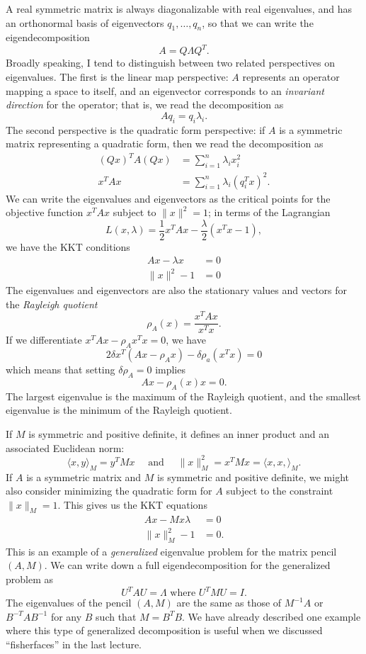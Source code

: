 \documentclass[12pt, leqno]{article} %
\begin{document}
A real symmetric matrix is always diagonalizable with
real eigenvalues, and has an orthonormal basis of eigenvectors
$q_1, \ldots, q_n$, so that we can write the eigendecomposition
\[
  A = Q \Lambda Q^T.
\]
Broadly speaking, I tend to distinguish between two related
perspectives on eigenvalues.  The first is the linear map
perspective: $A$ represents an operator mapping a space to itself,
and an eigenvector corresponds to an {\em invariant direction}
for the operator; that is, we read the decomposition as
\[
  A q_i = q_i \lambda_i.
\]  
The second perspective is the quadratic form
perspective: if $A$ is a symmetric matrix representing a quadratic
form, then we read the decomposition as
\begin{align*}
  (Qx)^T A (Qx) &= \sum_{i=1}^n \lambda_i x_i^2 \\
  x^T A x &= \sum_{i=1}^n \lambda_i (q_i^T x)^2.
\end{align*}
We can write the eigenvalues and eigenvectors as the critical points
for the objective function $x^T A x$ subject to $\|x\|^2 = 1$;
in terms of the Lagrangian
\[
  L(x,\lambda) = \frac{1}{2} x^T A x - \frac{\lambda}{2} (x^T x - 1),
\]
we have the KKT conditions
\begin{align*}
  Ax - \lambda x &= 0 \\
 \|x\|^2-1 &= 0
\end{align*}
The eigenvalues and eigenvectors are also the
stationary values and vectors for the {\em Rayleigh quotient}
\[
  \rho_A(x) = \frac{x^T A x}{x^T x}.
\]
If we differentiate $x^T A x - \rho_A x^T x = 0$, we have
\[
  2 \delta x^T (Ax - \rho_A x) - \delta \rho_a (x^T x) = 0
\]
which means that setting $\delta \rho_A = 0$ implies
\[
  Ax-\rho_A(x) x = 0.
\]
The largest eigenvalue is the maximum of the Rayleigh quotient,
and the smallest eigenvalue is the minimum of the Rayleigh quotient.

If $M$ is symmetric and positive definite, it defines an inner product
and an associated Euclidean norm:
\[
  \langle x, y \rangle_M = y^T M x \quad \mbox{ and } \quad
  \|x\|_M^2 = x^T M x = \langle x, x, \rangle_M.
\]
If $A$ is a symmetric matrix and $M$ is symmetric and positive
definite, we might also consider minimizing the quadratic form for
$A$ subject to the constraint $\|x\|_M = 1$.  This gives us the
KKT equations
\begin{align*}
  Ax - Mx \lambda &= 0 \\
  \|x\|_M^2 - 1 &= 0.
\end{align*}
This is an example of a {\em generalized} eigenvalue problem for the
matrix pencil $(A,M)$.  We can write down a full eigendecomposition
for the generalized problem as
\[
  U^T A U = \Lambda \mbox{ where } U^T M U = I.
\]
The eigenvalues of the pencil $(A,M)$ are the same as those
of $M^{-1} A$ or $B^{-T} A B^{-1}$ for any $B$ such that $M = B^T B$.
We have already described one example where this type of generalized
decomposition is useful when we discussed ``fisherfaces'' in the last
lecture.
\end{document}

